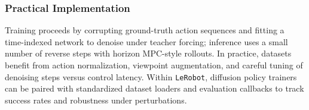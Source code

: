 \subsubsection{Practical Implementation}
Training proceeds by corrupting ground-truth action sequences and fitting a time-indexed network to denoise under teacher forcing; inference uses a small number of reverse steps with horizon MPC-style rollouts. In practice, datasets benefit from action normalization, viewpoint augmentation, and careful tuning of denoising steps versus control latency. Within \texttt{LeRobot}, diffusion policy trainers can be paired with standardized dataset loaders and evaluation callbacks to track success rates and robustness under perturbations.